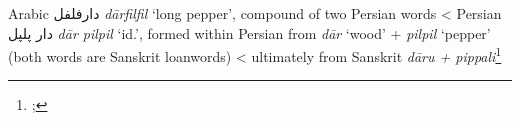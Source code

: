 \begin{etymology}\label{ety:darfilfil}
Arabic {دارفلفل} \textit{dārfilfil} `long pepper', compound of two Persian words
< Persian {دار پلپل‎} \textit{dār pilpil} `id.', formed within Persian from \textit{dār} `wood' + \textit{pilpil} `pepper' (both words are Sanskrit loanwords)
< ultimately from Sanskrit \textit{dāru + pippali}\footnote{\textcite[2435]{lane_arabic-english_1863}; }
\end{etymology}